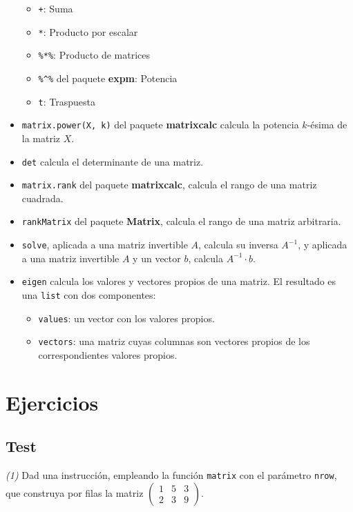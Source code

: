 \documentclass[]{book}
\providecommand{\tightlist}{%
  \setlength{\itemsep}{0pt}\setlength{\parskip}{0pt}}
\theoremstyle{definition}
\theoremstyle{definition}
\theoremstyle{definition}
\theoremstyle{remark}
\begin{document}
\begin{itemize}
  \begin{itemize}
  \tightlist
  \item
    \texttt{+}: Suma
  \item
    \texttt{*}: Producto por escalar
  \item
    \texttt{\%*\%}: Producto de matrices
  \item
    \texttt{\%\^{}\%} del paquete \textbf{expm}: Potencia
  \item
    \texttt{t}: Traspuesta
  \end{itemize}
\item
  \texttt{matrix.power(X,\ k)} del paquete \textbf{matrixcalc} calcula la potencia \(k\)-ésima de la matriz \(X\).
\item
  \texttt{det} calcula el determinante de una matriz.
\item
  \texttt{matrix.rank} del paquete \textbf{matrixcalc}, calcula el rango de una matriz cuadrada.
\item
  \texttt{rankMatrix} del paquete \textbf{Matrix}, calcula el rango de una matriz arbitraria.
\item
  \texttt{solve}, aplicada a una matriz invertible \(A\), calcula su inversa \(A^{-1}\), y aplicada a una matriz invertible \(A\) y un vector \(b\), calcula \(A^{-1}\cdot b\).
\item
  \texttt{eigen} calcula los valores y vectores propios de una matriz. El resultado es una \texttt{list} con dos componentes:

  \begin{itemize}
  \tightlist
  \item
    \texttt{values}: un vector con los valores propios.
  \item
    \texttt{vectors}: una matriz cuyas columnas son vectores propios de los correspondientes valores propios.
  \end{itemize}
\end{itemize}

\hypertarget{ejercicios-3}{%
\section{Ejercicios}\label{ejercicios-3}}

\hypertarget{test-2}{%
\subsection*{Test}\label{test-2}}

\emph{(1)} Dad una instrucción, empleando la función \texttt{matrix} con el parámetro \texttt{nrow}, que construya por filas la matriz
\(\left(\begin{array}{ccc} 1 & 5 & 3\\ 2 & 3 & 9\end{array} \right)\).
\end{document}
